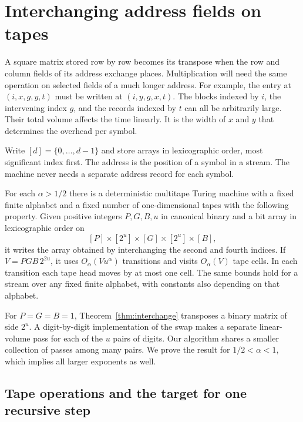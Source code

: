 \section{Interchanging address fields on tapes}
\label{sec:interchange}

A square matrix stored row by row becomes its transpose when the row
and column fields of its address exchange places. Multiplication will
need the same operation on selected fields of a much longer address.
For example, the entry at $(i,x,g,y,t)$ must be written at
$(i,y,g,x,t)$. The blocks indexed by $i$, the intervening index $g$,
and the records indexed by $t$ can all be arbitrarily large. Their
total volume affects the time linearly. It is the width of $x$ and
$y$ that determines the overhead per symbol.

Write $[d]=\{0,\ldots,d-1\}$ and store arrays in lexicographic order,
most significant index first. The address is the position of a symbol
in a stream. The machine never needs a separate address record for
each symbol.

\begin{theorem}\label{thm:interchange}
For each $\alpha>1/2$ there is a deterministic multitape Turing machine
with a fixed finite alphabet and a fixed number of one-dimensional tapes
with the following property. Given positive integers $P,G,B,u$ in
canonical binary and a bit array in lexicographic order on
\[
          [P]\times[2^u]\times[G]\times[2^u]\times[B],
\]
it writes the array obtained by interchanging the second and fourth
indices. If $V=PGB\,2^{2u}$, it uses $O_\alpha(Vu^\alpha)$ transitions
and visits $O_\alpha(V)$ tape cells. In each transition each tape head
moves by at most one cell. The same bounds hold for a stream over any
fixed finite alphabet, with constants also depending on that alphabet.
\end{theorem}

For $P=G=B=1$, Theorem~\ref{thm:interchange} transposes a binary
matrix of side $2^u$. A digit-by-digit implementation of the swap
makes a separate linear-volume pass for each of the $u$ pairs of
digits. Our algorithm shares a smaller collection of passes among
many pairs. We prove the result for $1/2<\alpha<1$, which implies all
larger exponents as well.

\subsection{Tape operations and the target for one recursive step}

